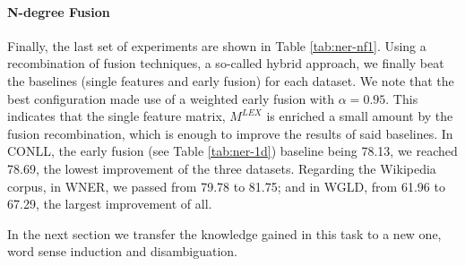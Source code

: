 \documentclass{llncs}
\newcommand\mlex{M^{\scriptscriptstyle LEX}}
\begin{document}
\paragraph{N-degree Fusion}
Finally, the last set of experiments are shown in Table \ref{tab:ner-nf1}. Using a recombination of fusion techniques, a so-called hybrid approach, we finally beat the baselines (single features and early fusion) for each dataset. We note that the best configuration made use of a weighted early fusion with $\alpha=0.95$. This indicates that the single feature matrix, $\mlex$ is enriched a small amount by the fusion recombination, which is enough to improve the results of said baselines. In CONLL, the early fusion (see Table \ref{tab:ner-1d}) baseline being 78.13, we reached 78.69, the lowest improvement of the three datasets. Regarding the Wikipedia corpus, in WNER, we passed from 79.78 to 81.75; and in WGLD, from 61.96 to 67.29, the largest improvement of all.

In the next section we transfer the knowledge gained in this task to a new one, word sense induction and disambiguation.
\end{document}
